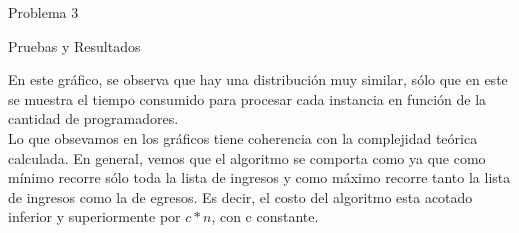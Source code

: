 \begin{section}{Problema 3}
\begin{subsection}{Pruebas y Resultados}
	\VSP
	
	En este gráfico, se observa que hay una distribución muy similar, sólo que en este se muestra el tiempo consumido para procesar cada instancia en función de la cantidad de programadores.\\

	Lo que obsevamos en los gráficos tiene coherencia con la complejidad teórica calculada. 
	En general, vemos que el algoritmo se comporta como  ya que como mínimo recorre sólo toda la lista de ingresos y como máximo recorre tanto la lista de ingresos como la de egresos. Es decir, el costo del algoritmo esta acotado inferior y superiormente por $c*n$, con c constante.

	\newpage

	\end{subsection}

\end{section}







